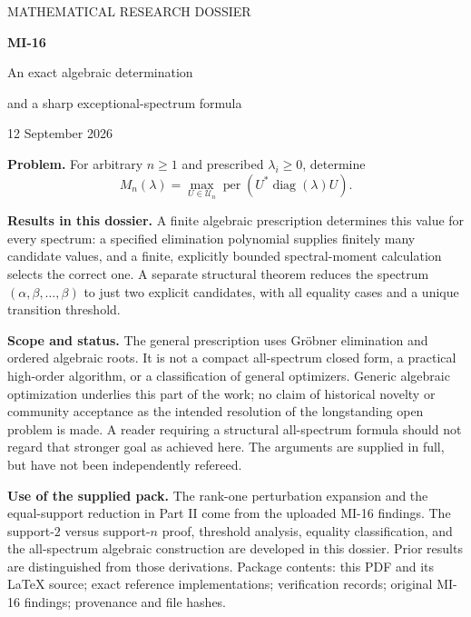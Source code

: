\documentclass[11pt]{article}
\newcommand{\per}{\operatorname{per}}
\newcommand{\diag}{\operatorname{diag}}
\newcommand{\U}{\mathcal U}
\theoremstyle{definition}\newtheorem{definition}[theorem]{Definition}
\theoremstyle{remark}\newtheorem{remark}[theorem]{Remark}
\begin{document}
\begin{titlepage}
\vspace*{12mm}
{\small\sffamily MATHEMATICAL RESEARCH DOSSIER\par}
\vspace{7mm}
{\LARGE\bfseries MI-16\par}
\vspace{3mm}
{\Large An exact algebraic determination\par}
{\Large and a sharp exceptional-spectrum formula\par}
\vspace{8mm}
{\large 12 September 2026\par}
\vspace{10mm}
\textbf{Problem.} For arbitrary $n\geq1$ and prescribed $\lambda_i\geq0$, determine
\[
 M_n(\lambda)=\max_{U\in\U_n}\per\!\left(U^*\diag(\lambda)U\right).
\]
\par\vspace{4mm}
\textbf{Results in this dossier.} A finite algebraic prescription determines this value for every spectrum: a specified elimination polynomial supplies finitely many candidate values, and a finite, explicitly bounded spectral-moment calculation selects the correct one. A separate structural theorem reduces the spectrum $(\alpha,\beta,\ldots,\beta)$ to just two explicit candidates, with all equality cases and a unique transition threshold.
\par\vspace{4mm}
\textbf{Scope and status.} The general prescription uses Gr\"obner elimination and ordered algebraic roots. It is not a compact all-spectrum closed form, a practical high-order algorithm, or a classification of general optimizers. Generic algebraic optimization underlies this part of the work; no claim of historical novelty or community acceptance as the intended resolution of the longstanding open problem is made. A reader requiring a structural all-spectrum formula should not regard that stronger goal as achieved here. The arguments are supplied in full, but have not been independently refereed.
\par\vspace{4mm}
\textbf{Use of the supplied pack.} The rank-one perturbation expansion and the equal-support reduction in Part II come from the uploaded MI-16 findings. The support-$2$ versus support-$n$ proof, threshold analysis, equality classification, and the all-spectrum algebraic construction are developed in this dossier. Prior results are distinguished from those derivations.
\vfill
{\small Package contents: this PDF and its \LaTeX{} source; exact reference implementations; verification records; original MI-16 findings; provenance and file hashes.}
\end{titlepage}
\begingroup\setlength{\parskip}{0pt}\small\tableofcontents\endgroup
\newpage
\end{document}
